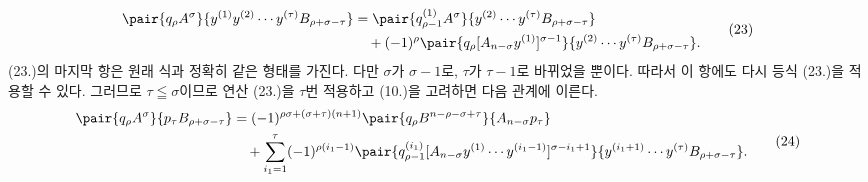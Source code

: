 
\begin{equation}
\begin{aligned}
\pair{q_\rho A^\sigma}{y^{(1)}y^{(2)}\cdots y^{(\tau)}B_{\rho+\sigma-\tau}}
&=\pair{q_{\rho-1}^{(1)}A^\sigma}{y^{(2)}\cdots y^{(\tau)}B_{\rho+\sigma-\tau}}\\
&\quad+(-1)^\rho\pair{q_\rho[A_{n-\sigma}y^{(1)}]^{\sigma-1}}{y^{(2)}\cdots y^{(\tau)}B_{\rho+\sigma-\tau}}.
\end{aligned}
\tag{23}
\end{equation}
(23.)의 마지막 항은 원래 식과 정확히 같은 형태를 가진다. 다만 $\sigma$가 $\sigma-1$로, $\tau$가 $\tau-1$로 바뀌었을 뿐이다. 따라서 이 항에도 다시 등식 (23.)을 적용할 수 있다. 그러므로 $\tau\leqq\sigma$이므로 연산 (23.)을 $\tau$번 적용하고 (10.)을 고려하면 다음 관계에 이른다.
\begin{equation}
\begin{aligned}
\pair{q_\rho A^\sigma}{p_\tau B_{\rho+\sigma-\tau}}
&=(-1)^{\rho\sigma+(\sigma+\tau)(n+1)}
  \pair{q_\rho B^{n-\rho-\sigma+\tau}}{A_{n-\sigma}p_\tau}\\
&\quad+\sum_{i_1=1}^{\tau}(-1)^{\rho(i_1-1)}
 \pair{q_{\rho-1}^{(i_1)}[A_{n-\sigma}y^{(1)}\cdots y^{(i_1-1)}]^{\sigma-i_1+1}}
 {y^{(i_1+1)}\cdots y^{(\tau)}B_{\rho+\sigma-\tau}}.
\end{aligned}
\tag{24}
\end{equation}
